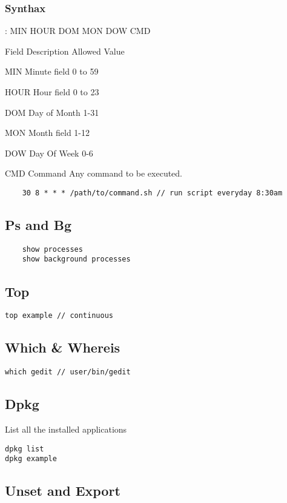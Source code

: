     \subsubsection{Synthax}

    : MIN HOUR DOM MON DOW CMD

    Field    Description    Allowed Value

    MIN      Minute field    0 to 59

    HOUR     Hour field      0 to 23

    DOM      Day of Month    1-31

    MON      Month field     1-12

    DOW      Day Of Week     0-6

    CMD      Command         Any command to be executed.

    \begin{verbatim}
    30 8 * * * /path/to/command.sh // run script everyday 8:30am
    \end{verbatim}

\subsection{Ps and Bg}
\begin{verbatim}
    show processes
    show background processes
\end{verbatim}

\subsection{Top}
\begin{verbatim}
top example // continuous
\end{verbatim}
\subsection{Which & Whereis}
\begin{verbatim}
which gedit // user/bin/gedit 
\end{verbatim}

\subsection{Dpkg}

     List all the installed applications
\begin{verbatim}
dpkg list
dpkg example 
\end{verbatim}

\subsection{Unset and Export}

